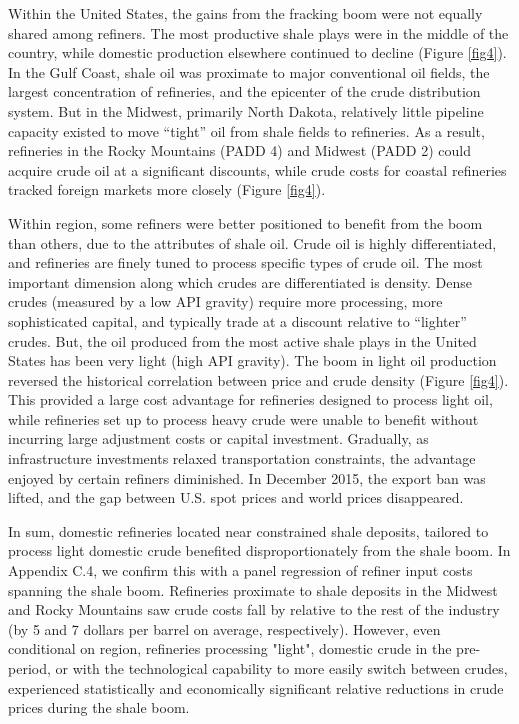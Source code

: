 \documentclass[12pt]{article}
\begin{document}
Within the United States, the gains from the fracking boom were not equally shared among refiners. The most productive shale plays were in the middle of the country, while domestic production elsewhere continued to decline (Figure \ref{fig4}\hspace{-1pt}). In the Gulf Coast, shale oil was proximate to major conventional oil fields, the largest concentration of refineries, and the epicenter of the crude distribution system. But in the Midwest, primarily North Dakota, relatively little pipeline capacity existed to move ``tight'' oil from shale fields to refineries. As a result, refineries in the Rocky Mountains (PADD 4) and Midwest (PADD 2) could acquire crude oil at a significant discounts, while crude costs for coastal refineries tracked foreign markets more closely (Figure \ref{fig4}\hspace{-1pt}).

Within region, some refiners were better positioned to benefit from the boom than others, due to the attributes of shale oil. Crude oil is highly differentiated, and refineries are finely tuned to process specific types of crude oil. The most important dimension along which crudes are differentiated is density. Dense crudes (measured by a low API gravity) require more processing,  more sophisticated capital, and typically trade at a discount relative to ``lighter'' crudes.  But, the oil produced from the most active shale plays in the United States has been very light (high API gravity).  The boom in light oil production reversed the historical correlation between price and crude density (Figure \ref{fig4}\hspace{-1pt}). This provided a large cost advantage for refineries designed to process light oil, while refineries set up to process heavy crude were unable to benefit without incurring large adjustment costs or capital investment. Gradually, as infrastructure investments relaxed transportation constraints, the advantage enjoyed by certain refiners diminished.  In December 2015, the export ban was lifted, and the gap between U.S. spot prices and world prices disappeared.

In sum, domestic refineries located near constrained shale deposits, tailored to process light domestic crude benefited disproportionately from the shale boom. In Appendix C.4, we confirm this with a panel regression of refiner input costs spanning the shale boom. Refineries proximate to shale deposits in the Midwest and Rocky Mountains saw crude costs fall by relative to the rest of the industry (by 5 and 7 dollars per barrel on average, respectively). However, even conditional on region, refineries processing "light", domestic crude in the pre-period, or with the technological capability to more easily switch between crudes, experienced statistically and economically significant relative reductions in crude prices during the shale boom.
\end{document}
